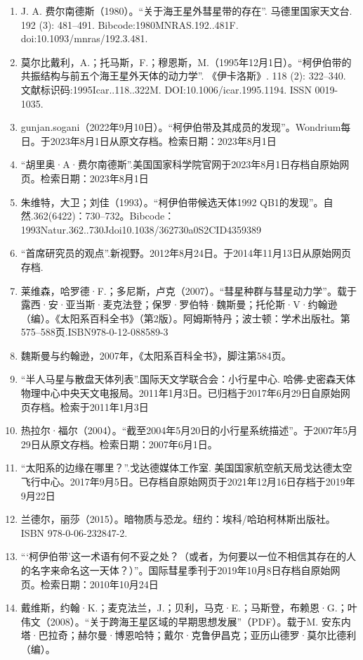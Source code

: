 \begin{enumerate}
\item J. A. 费尔南德斯（1980）。“关于海王星外彗星带的存在”. 马德里国家天文台. 192 (3): 481–491. Bibcode:1980MNRAS.192..481F. doi:10.1093/mnras/192.3.481.
\item 莫尔比戴利，A.；托马斯，F.；穆恩斯，M.（1995年12月1日）。“柯伊伯带的共振结构与前五个海王星外天体的动力学”. 《伊卡洛斯》. 118 (2): 322–340. 文献标识码:1995Icar..118..322M. DOI:10.1006/icar.1995.1194. ISSN 0019-1035.
\item gunjan.sogani（2022年9月10日）。“柯伊伯带及其成员的发现”。Wondrium每日。于2023年8月1日从原文存档。检索日期：2023年8月1日
\item “胡里奥·A·费尔南德斯”.美国国家科学院官网于2023年8月1日存档自原始网页。检索日期：2023年8月1日
\item 朱维特，大卫；刘佳（1993）。“柯伊伯带候选天体1992 QB1的发现”。自然.362(6422)：730–732。Bibcode：1993Natur.362..730Jdoi10.1038/362730a0S2CID4359389
\item “首席研究员的观点”.新视野。2012年8月24日。于2014年11月13日从原始网页存档.
\item 莱维森，哈罗德·F.；多尼斯，卢克（2007）。“彗星种群与彗星动力学”。载于露西·安·亚当斯·麦克法登；保罗·罗伯特·魏斯曼；托伦斯·V·约翰逊（编）。《太阳系百科全书》（第2版）。阿姆斯特丹；波士顿：学术出版社。第575–588页.ISBN978-0-12-088589-3
\item 魏斯曼与约翰逊，2007年，《太阳系百科全书》，脚注第584页。
\item “半人马星与散盘天体列表”.国际天文学联合会：小行星中心. 哈佛-史密森天体物理中心中央天文电报局。2011年1月3日。已归档于2017年6月29日自原始网页存档。检索于2011年1月3日
\item 热拉尔·福尔（2004）。“截至2004年5月20日的小行星系统描述”。于2007年5月29日从原文存档。检索日期：2007年6月1日。
\item “太阳系的边缘在哪里？”.戈达德媒体工作室. 美国国家航空航天局戈达德太空飞行中心。2017年9月5日。已存档自原始网页于2021年12月16日存档于2019年9月22日
\item 兰德尔，丽莎（2015）。暗物质与恐龙。纽约：埃科/哈珀柯林斯出版社。ISBN 978-0-06-232847-2.
\item “‘柯伊伯带’这一术语有何不妥之处？（或者，为何要以一位不相信其存在的人的名字来命名这一天体？）”。国际彗星季刊于2019年10月8日存档自原始网页。检索日期：2010年10月24日
\item 戴维斯，约翰·K.；麦克法兰，J.；贝利，马克·E.；马斯登，布赖恩·G.；叶伟文（2008）。“关于跨海王星区域的早期思想发展”（PDF）。载于M. 安东内塔·巴拉奇；赫尔曼·博恩哈特；戴尔·克鲁伊昌克；亚历山德罗·莫尔比德利（编）。

\end{enumerate}
